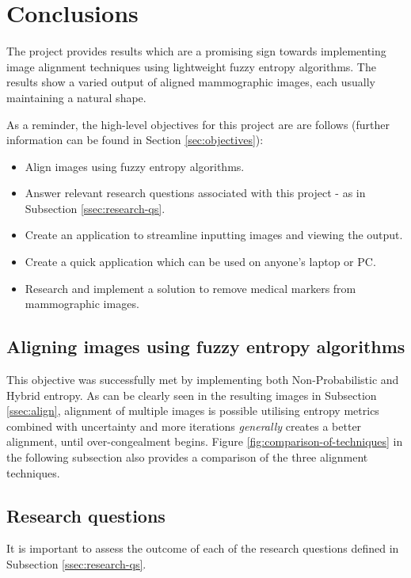 \section{Conclusions}

The project provides results which are a promising sign towards implementing image alignment techniques using lightweight fuzzy entropy algorithms. The results show a varied output of aligned \gls{mammographic images}, each usually maintaining a natural shape.

As a reminder, the high-level objectives for this project are are follows (further information can be found in Section \ref{sec:objectives}):

\begin{itemize}
  \item Align images using fuzzy entropy algorithms.
  \item Answer relevant research questions associated with this project - as in Subsection \ref{ssec:research-qs}.
  \item Create an application to streamline inputting images and viewing the output.
  \item Create a quick application which can be used on anyone's laptop or PC.
  \item Research and implement a solution to remove medical markers from mammographic images.
\end{itemize}

\subsection{Aligning images using fuzzy entropy algorithms}

This objective was successfully met by implementing both Non-Probabilistic and Hybrid entropy. As can be clearly seen in the resulting images in Subsection \ref{ssec:align}, alignment of multiple images is possible utilising entropy metrics combined with uncertainty and more iterations \textit{generally} creates a better alignment, until over-congealment begins. Figure \ref{fig:comparison-of-techniques} in the following subsection also provides a comparison of the three alignment techniques.

\subsection{Research questions}

It is important to assess the outcome of each of the research questions defined in Subsection \ref{ssec:research-qs}.


